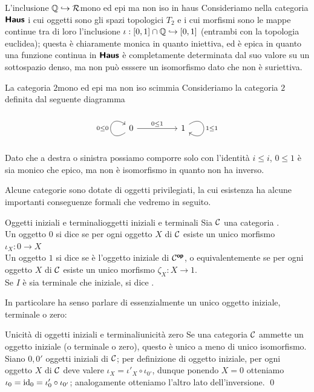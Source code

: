 \documentclass[openany]{book}
\renewcommand\C{\mc{C}}
\begin{document}
\begin{example}{L'inclusione $\mathbb{Q}\hookrightarrow \mathcal{R}$}{mono ed epi ma non iso in haus}
    Consideriamo nella categoria $\text{\sffamily\textbf{Haus}}$ i cui oggetti sono gli spazi topologici $T_2$ e i cui morfismi sono le mappe continue tra di loro l'inclusione $\iota: [0,1]\cap \mathbb{Q}\hookrightarrow[0,1]$ (entrambi con la topologia euclidea); questa è chiaramente monica in quanto iniettiva, ed è epica in quanto una funzione continua in $\text{\sffamily\textbf{Haus}}$ è completamente determinata dal suo valore su un sottospazio denso, ma non può esssere un isomorfismo dato che non è suriettiva.
\end{example}

\begin{example}{La categoria $2$}{mono ed epi ma non iso scimmia}
    Consideriamo la categoria $2$ definita dal seguente diagramma
        \[\begin{tikzcd}
        	0 && 1
    	    \arrow["0\le 0", from=1-1, to=1-1, loop, in=145, out=215, distance=10mm]
        	\arrow["0\le 1", from=1-1, to=1-3]
    	    \arrow["1\le 1", from=1-3, to=1-3, loop, in=325, out=35, distance=10mm]
        \end{tikzcd}\]
    Dato che a destra o sinistra possiamo comporre solo con l'identità $i\le i$, $0\le 1$ è sia monico che epico, ma non è isomorfismo in quanto non ha inverso.
\end{example}

Alcune categorie sono dotate di oggetti privilegiati, la cui esistenza ha alcune importanti conseguenze formali che vedremo in seguito.

\begin{definition}{Oggetti iniziali e terminali}{oggetti iniziali e terminali}
    Sia $\C$ una categoria .\\
    Un oggetto $0$ si dice  se per ogni oggetto $X$ di $\C$ esiste un unico morfismo $\iota_X:0\to X$\\
    Un oggetto $1$ si dice  se è l'oggetto iniziale di $\C^\op$, o equivalentemente se per ogni oggetto $X$ di $\C$ esiste un unico morfismo $\zeta_X : X\to 1$.\\
    Se $I$ è sia terminale che iniziale, si dice .
\end{definition}

In particolare ha senso parlare di essenzialmente un unico oggetto iniziale, terminale o zero:

\begin{proposition}{Unicità di oggetti iniziali e terminali}{unicità zero}
    Se una categoria $\C$ ammette un oggetto iniziale (o terminale o zero), questo è unico a meno di unico isomorfismo.
    \proof 
    Siano $0, 0'$ oggetti iniziali di $\C$; per definizione di oggetto iniziale, per ogni oggetto $X$ di $\C$ deve valere $\iota_X = \iota'_X \circ \iota_{0'}$, dunque ponendo $X=0$ otteniamo $\iota_0 = \operatorname{id}_0 = \iota'_0\circ \iota_{0'}$; analogamente otteniamo l'altro lato dell'inversione.
    \qed
\end{proposition}
\end{document}
